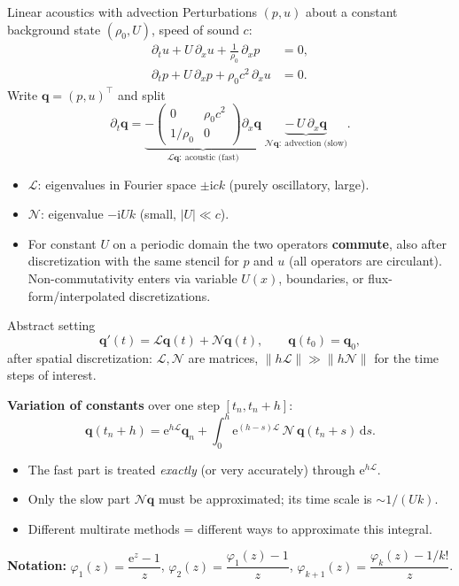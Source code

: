 \documentclass[aspectratio=169,10pt]{beamer}
\newcommand{\dd}{\mathrm{d}}
\newcommand{\ii}{\mathrm{i}}
\newcommand{\ee}{\mathrm{e}}
\newcommand{\bq}{\mathbf{q}}
\newcommand{\LL}{\mathcal{L}}   %
\newcommand{\NN}{\mathcal{N}}   %
\newcommand{\ph}{\varphi}
\begin{document}
\begin{frame}{Linear acoustics with advection}
  Perturbations $(p,u)$ about a constant background state $(\rho_0,U)$, speed of sound $c$:
  \begin{align*}
    \partial_t u + U\,\partial_x u + \tfrac{1}{\rho_0}\,\partial_x p &= 0,\\
    \partial_t p + U\,\partial_x p + \rho_0 c^2\,\partial_x u &= 0.
  \end{align*}
  Write $\bq=(p,u)^\top$ and split
  \[
    \partial_t \bq = \underbrace{-\begin{pmatrix}0&\rho_0c^2\\ 1/\rho_0&0\end{pmatrix}\partial_x\bq}_{\LL\bq:\ \text{acoustic (fast)}}
                   \;\underbrace{-\,U\,\partial_x\bq}_{\NN\bq:\ \text{advection (slow)}}.
  \]
  \begin{itemize}
    \item $\LL$: eigenvalues in Fourier space $\pm\ii c k$ (purely oscillatory, large).
    \item $\NN$: eigenvalue $-\ii U k$ (small, $|U|\ll c$).
    \item For constant $U$ on a periodic domain the two operators \textbf{commute}, also after discretization with
    the same stencil for $p$ and $u$ (all operators are circulant). Non-commutativity enters via
    variable $U(x)$, boundaries, or flux-form/interpolated discretizations.
  \end{itemize}
\end{frame}

\begin{frame}{Abstract setting}
  \[
    \bq'(t)=\LL\bq(t)+\NN\bq(t),\qquad \bq(t_0)=\bq_0 ,
  \]
  after spatial discretization: $\LL,\NN$ are matrices, $\|h\LL\|\gg\|h\NN\|$ for the time steps of interest.

  \medskip
  \textbf{Variation of constants} over one step $[t_n,t_n+h]$:
  \[
    \bq(t_n+h)=\ee^{h\LL}\bq_n+\int_0^h \ee^{(h-s)\LL}\,\NN\,\bq(t_n+s)\,\dd s .
  \]
  \begin{itemize}
    \item The fast part is treated \emph{exactly} (or very accurately) through $\ee^{h\LL}$.
    \item Only the slow part $\NN\bq$ must be approximated; its time scale is $\sim 1/(Uk)$.
    \item Different multirate methods = different ways to approximate this integral.
  \end{itemize}
  \vspace{0.3em}
  \textbf{Notation:} $\ph_1(z)=\dfrac{\ee^z-1}{z}$, \quad $\ph_2(z)=\dfrac{\ph_1(z)-1}{z}$, \quad $\ph_{k+1}(z)=\dfrac{\ph_k(z)-1/k!}{z}$.
\end{frame}
\end{document}
